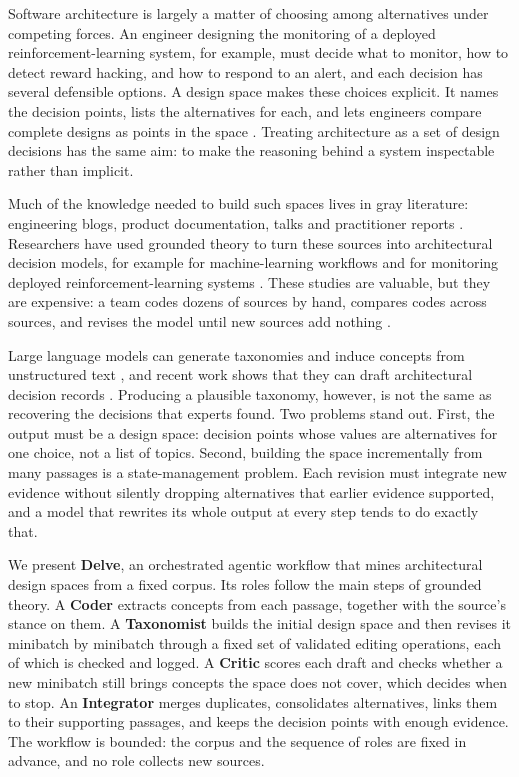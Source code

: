\documentclass[conference]{IEEEtran}
\begin{document}
Software architecture is largely a matter of choosing among alternatives under competing forces. An engineer designing the monitoring of a deployed reinforcement-learning system, for example, must decide what to monitor, how to detect reward hacking, and how to respond to an alert, and each decision has several defensible options. A design space makes these choices explicit. It names the decision points, lists the alternatives for each, and lets engineers compare complete designs as points in the space \cite{shaw,qoc}. Treating architecture as a set of design decisions \cite{jansenbosch,kruchten} has the same aim: to make the reasoning behind a system inspectable rather than implicit.

Much of the knowledge needed to build such spaces lives in gray literature: engineering blogs, product documentation, talks and practitioner reports \cite{garousi}. Researchers have used grounded theory to turn these sources into architectural decision models, for example for machine-learning workflows \cite{warnett} and for monitoring deployed reinforcement-learning systems \cite{fang}. These studies are valuable, but they are expensive: a team codes dozens of sources by hand, compares codes across sources, and revises the model until new sources add nothing \cite{stol}.

Large language models can generate taxonomies and induce concepts from unstructured text \cite{tnt,lloom}, and recent work shows that they can draft architectural decision records \cite{dhar}. Producing a plausible taxonomy, however, is not the same as recovering the decisions that experts found. Two problems stand out. First, the output must be a design space: decision points whose values are alternatives for one choice, not a list of topics. Second, building the space incrementally from many passages is a state-management problem. Each revision must integrate new evidence without silently dropping alternatives that earlier evidence supported, and a model that rewrites its whole output at every step tends to do exactly that.

We present \textbf{Delve}, an orchestrated agentic workflow \cite{lma} that mines architectural design spaces from a fixed corpus. Its roles follow the main steps of grounded theory. A \textbf{Coder} extracts concepts from each passage, together with the source's stance on them. A \textbf{Taxonomist} builds the initial design space and then revises it minibatch by minibatch through a fixed set of validated editing operations, each of which is checked and logged. A \textbf{Critic} scores each draft and checks whether a new minibatch still brings concepts the space does not cover, which decides when to stop. An \textbf{Integrator} merges duplicates, consolidates alternatives, links them to their supporting passages, and keeps the decision points with enough evidence. The workflow is bounded: the corpus and the sequence of roles are fixed in advance, and no role collects new sources.
\end{document}
